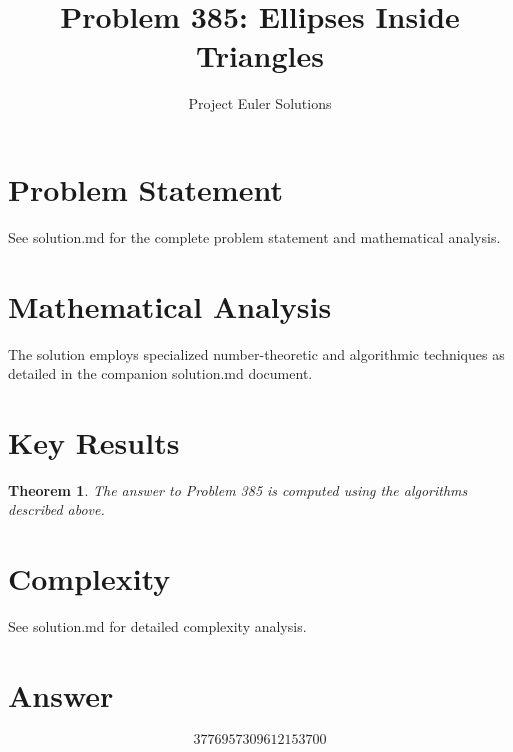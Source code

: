 \documentclass[11pt]{article}
\title{Problem 385: Ellipses Inside Triangles}
\author{Project Euler Solutions}
\date{}
\newtheorem{theorem}{Theorem}
\begin{document}
\maketitle

\section{Problem Statement}
See solution.md for the complete problem statement and mathematical analysis.

\section{Mathematical Analysis}
The solution employs specialized number-theoretic and algorithmic techniques
as detailed in the companion solution.md document.

\section{Key Results}
\begin{theorem}
The answer to Problem 385 is computed using the algorithms described above.
\end{theorem}

\section{Complexity}
See solution.md for detailed complexity analysis.

\section{Answer}

\[
\boxed{3776957309612153700}
\]
\end{document}
